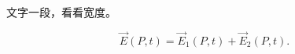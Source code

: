 ﻿\documentclass[11pt]{ctexart}
\begin{document}
文字一段，看看宽度。

\[
\vec{E}(P,t)=\vec{E}_1(P,t)+\vec{E}_2(P,t).
\]
\end{document}
